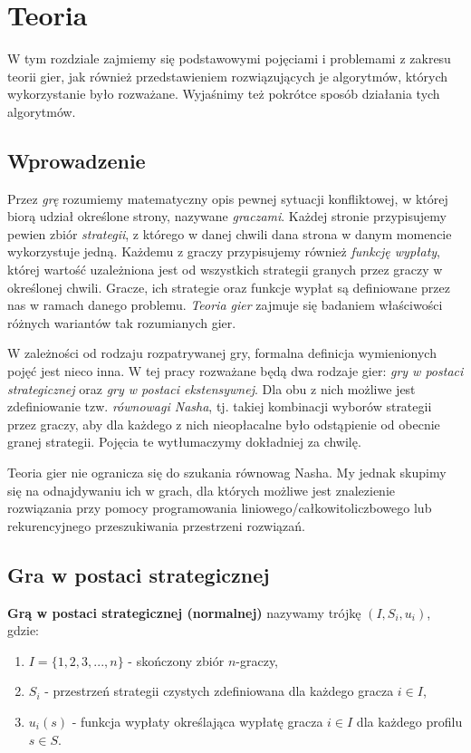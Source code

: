 \documentclass[polish]{standalone}
\begin{document}
\pagestyle{headings}

\chapter{Teoria}

W tym rozdziale zajmiemy się podstawowymi pojęciami i problemami z zakresu teorii gier, jak również przedstawieniem
rozwiązujących je algorytmów, których wykorzystanie było rozważane. Wyjaśnimy też pokrótce sposób działania tych
algorytmów.

\section{Wprowadzenie}

Przez \textit{grę} rozumiemy matematyczny opis pewnej sytuacji konfliktowej, w której biorą udział określone strony,
nazywane \textit{graczami}. Każdej stronie przypisujemy pewien zbiór \textit{strategii}, z którego w danej chwili dana
strona w danym momencie wykorzystuje jedną. Każdemu z graczy przypisujemy również \textit{funkcję wypłaty}, której
wartość uzależniona jest od wszystkich strategii granych przez graczy w określonej chwili. Gracze, ich strategie oraz
funkcje wypłat są definiowane przez nas w ramach danego problemu. \textit{Teoria gier} zajmuje się badaniem właściwości
różnych wariantów tak rozumianych gier.

W zależności od rodzaju rozpatrywanej gry, formalna definicja wymienionych pojęć jest nieco inna. W tej pracy rozważane
będą dwa rodzaje gier: \textit{gry w postaci strategicznej} oraz \textit{gry w postaci ekstensywnej}. Dla obu z nich
możliwe jest zdefiniowanie tzw. \textit{równowagi Nasha}, tj. takiej kombinacji wyborów strategii przez graczy, aby dla
każdego z nich nieopłacalne było odstąpienie od obecnie granej strategii. Pojęcia te wytłumaczymy dokładniej za chwilę.

Teoria gier nie ogranicza się do szukania równowag Nasha. My jednak skupimy się na odnajdywaniu ich w grach, dla
których możliwe jest znalezienie rozwiązania przy pomocy programowania liniowego/całkowitoliczbowego lub rekurencyjnego
przeszukiwania przestrzeni rozwiązań.

\section{Gra w postaci strategicznej}

\begin{definition}
\textbf{Grą w postaci strategicznej (normalnej)} nazywamy trójkę
$(I, S_i, u_i)$, gdzie:
\begin{enumerate}
\item $I = \{ 1, 2, 3, ..., n \}$ - skończony zbiór $n$-graczy,
\item $S_i$ - przestrzeń strategii czystych zdefiniowana dla każdego gracza $i \in I$,
\item $u_i(s)$ - funkcja wypłaty określająca wypłatę gracza $i \in I$ dla każdego profilu
$s \in S$.
\end{enumerate}
\cite[str.~4]{FT-GT}
\end{definition}
\end{document}
